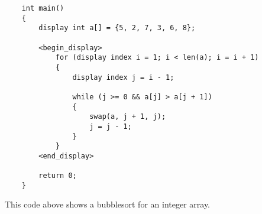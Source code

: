 \begin{verbatim}
    int main()
    {
        display int a[] = {5, 2, 7, 3, 6, 8};

        <begin_display>
            for (display index i = 1; i < len(a); i = i + 1)
            {
                display index j = i - 1;

                while (j >= 0 && a[j] > a[j + 1])
                {
                    swap(a, j + 1, j);
                    j = j - 1;
                }
            }
        <end_display>

        return 0;
    }
\end{verbatim}

This code above shows a bubblesort for an integer array.
